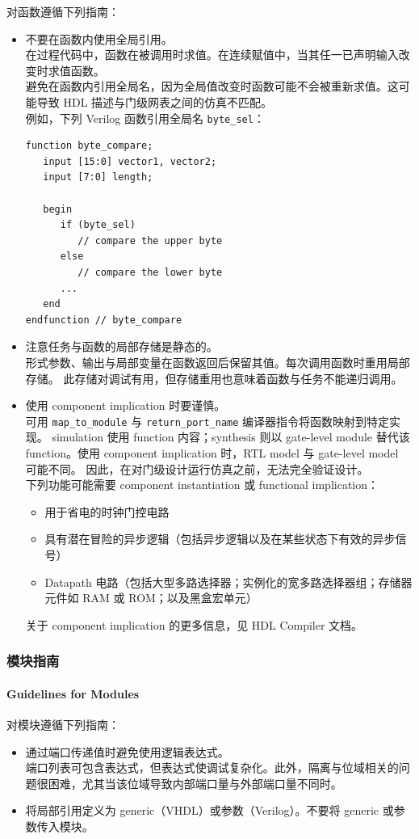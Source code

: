 对函数遵循下列指南：
\begin{itemize}
  \item 不要在函数内使用全局引用。\\
        在过程代码中，函数在被调用时求值。在连续赋值中，当其任一已声明输入改变时求值函数。\\
        避免在函数内引用全局名，因为全局值改变时函数可能不会被重新求值。这可能导致 HDL 描述与门级网表之间的仿真不匹配。\\
        例如，下列 Verilog 函数引用全局名 \texttt{byte\_sel}：
\begin{lstlisting}
function byte_compare;
   input [15:0] vector1, vector2;
   input [7:0] length;

   begin
      if (byte_sel)
         // compare the upper byte
      else
         // compare the lower byte
      ...
   end
endfunction // byte_compare
\end{lstlisting}
  \item 注意任务与函数的局部存储是静态的。\\
        形式参数、输出与局部变量在函数返回后保留其值。每次调用函数时重用局部存储。
        此存储对调试有用，但存储重用也意味着函数与任务不能递归调用。
  \item 使用 component implication 时要谨慎。\\
        可用 \texttt{map\_to\_module} 与 \texttt{return\_port\_name} 编译器指令将函数映射到特定实现。
        simulation 使用 function 内容；synthesis 则以 gate-level module 替代该 function。使用 component implication 时，RTL model 与 gate-level model 可能不同。
        因此，在对门级设计运行仿真之前，无法完全验证设计。\\
        下列功能可能需要 component instantiation 或 functional implication：
  \begin{itemize}
    \item 用于省电的时钟门控电路
    \item 具有潜在冒险的异步逻辑（包括异步逻辑以及在某些状态下有效的异步信号）
    \item Datapath 电路（包括大型多路选择器；实例化的宽多路选择器组；存储器元件如 RAM 或 ROM；以及黑盒宏单元）
  \end{itemize}
        关于 component implication 的更多信息，见 HDL Compiler 文档。
\end{itemize}

\subsubsection{模块指南}
\paragraph*{Guidelines for Modules}

对模块遵循下列指南：
\begin{itemize}
  \item 通过端口传递值时避免使用逻辑表达式。\\
        端口列表可包含表达式，但表达式使调试复杂化。此外，隔离与位域相关的问题很困难，尤其当该位域导致内部端口量与外部端口量不同时。
  \item 将局部引用定义为 generic（VHDL）或参数（Verilog）。不要将 generic 或参数传入模块。
\end{itemize}

